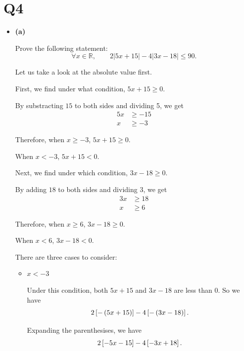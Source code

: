 \section{Q4}
\begin{itemize}
    \item \textbf{(a)}
    \begin{problem}
        Prove the following statement:
        \[
            \forall x\in\mathbb{R},
            \qquad
            2|5x+15|-4|3x-18|\leq 90.
        \]
    \end{problem}

    \begin{solution}
        Let us take a look at the absolute value first. 

        First, we find under what condition, $5x + 15 \geq 0$. 

        By substracting $15$ to both sides and dividing 5, we get 
        \begin{align*}
            5x &\geq -15 \\
            x &\geq -3
        \end{align*}

        Therefore, when $x \geq -3$, $5x + 15 \geq 0$. 

        When $x < -3$, $5x + 15 < 0$. 

        Next, we find under which condition, $3x - 18 \geq 0$. 

         By adding $18$ to both sides and dividing 3, we get 
         \begin{align*}
            3x &\geq 18 \\
            x &\geq 6
        \end{align*}

        Therefore, when $x \geq 6$, $3x - 18 \geq 0$. 

        When $x < 6$, $3x - 18 < 0$. 

        There are three cases to consider:
    \begin{itemize}
        \item $x < -3$
        
        Under this condition, both $5x + 15$ and $3x - 18$ are less than 0. So we have 
        \begin{equation*}
            2\left[-\left(5x + 15\right)\right] - 4\left[-\left(3x - 18\right)\right]. 
        \end{equation*}

        Expanding the parenthesises, we have
        \begin{equation*}
            2 \left[-5x - 15\right] - 4\left[-3x + 18\right]. 
        \end{equation*} 


\end{itemize}
\end{solution}
\end{itemize}
